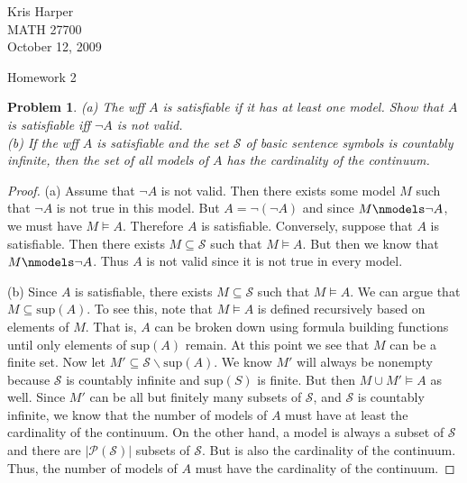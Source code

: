 \documentclass{article}
\newtheorem{problem}{Problem}
\begin{document}
\begin{flushright}
Kris Harper\\

MATH 27700\\

October 12, 2009
\end{flushright}

\begin{center}
Homework 2
\end{center}

\begin{problem}
(a) The wff $A$ is \emph{satisfiable} if it has at least one model. Show that $A$ is satisfiable iff $\neg A$ is not valid.\\
(b) If the wff $A$ is satisfiable and the set $\mathcal{S}$ of basic sentence symbols is countably infinite, then the set of all models of $A$ has the cardinality of the continuum.
\end{problem}
\begin{proof}
(a) Assume that $\neg A$ is not valid. Then there exists some model $M$ such that $\neg A$ is not true in this model. But $A = \neg (\neg A)$ and since $M \nmodels \neg A$, we must have $M \models A$. Therefore $A$ is satisfiable. Conversely, suppose that $A$ is satisfiable. Then there exists $M \subseteq \mathcal{S}$ such that $M \models A$. But then we know that $M \nmodels \neg A$. Thus $A$ is not valid since it is not true in every model.

(b) Since $A$ is satisfiable, there exists $M \subseteq \mathcal{S}$ such that $M \models A$. We can argue that $M \subseteq \text{sup}(A)$. To see this, note that $M \models A$ is defined recursively based on elements of $M$. That is, $A$ can be broken down using formula building functions until only elements of $\text{sup}(A)$ remain. At this point we see that $M$ can be a finite set. Now let $M' \subseteq \mathcal{S} \backslash \text{sup}(A)$. We know $M'$ will always be nonempty because $\mathcal{S}$ is countably infinite and $\text{sup}(S)$ is finite. But then $M \cup M' \models A$ as well. Since $M'$ can be all but finitely many subsets of $\mathcal{S}$, and $\mathcal{S}$ is countably infinite, we know that the number of models of $A$ must have at least the cardinality of the continuum. On the other hand, a model is always a subset of $\mathcal{S}$ and there are $|\mathcal{P}(\mathcal{S})|$ subsets of $\mathcal{S}$. But is also the cardinality of the continuum. Thus, the number of models of $A$ must have the cardinality of the continuum.
\end{proof}
\end{document}
